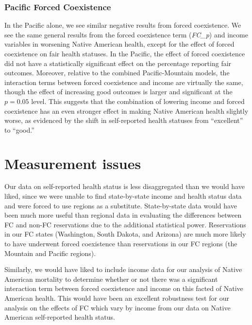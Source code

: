 \documentclass[12pt]{article}
\begin{document}
\subsubsection{Pacific Forced Coexistence}
In the Pacific alone, we see similar negative results from forced coexistence. 
We see the same general results from the forced coexistence term (\emph{FC\_p}) and income variables in worsening Native American health, except for the effect of forced coexistence on fair health statuses.
In the Pacific, the effect of forced coexistence did not have a statistically significant effect on the percentage reporting fair outcomes. 
Moreover, relative to the combined Pacific-Mountain models, the interaction terms between forced coexistence and income are virtually the same, though the effect of increasing good outcomes is larger and significant at the $p=0.05$ level. 
This suggests that the combination of lowering income and forced coexistence has an even stronger effect in making Native American health slightly worse, as evidenced by the shift in self-reported health statuses from ``excellent'' to ``good.''





\section{Measurement issues}

Our data on self-reported health status is less disaggregated than we would have liked, since we were unable to find state-by-state income and health status data and were forced to use regions as a substitute.  
State-by-state data would have been much more useful than regional data in evaluating the differences between FC and non-FC reservations due to the additional statistical power.
Reservations in our FC states (Washington, South Dakota, and Arizona) are much more likely to have underwent forced coexistence than reservations in our FC regions (the Mountain and Pacific regions).

Similarly, we would have liked to include income data for our analysis of Native American mortality to  determine whether or not there was a significant interaction term between forced coexistence and income on this facted of Native American health.
This would have been an excellent robustness test for our analysis on the effects of FC which vary by income from our data on Native American self-reported health status.  
\end{document}
